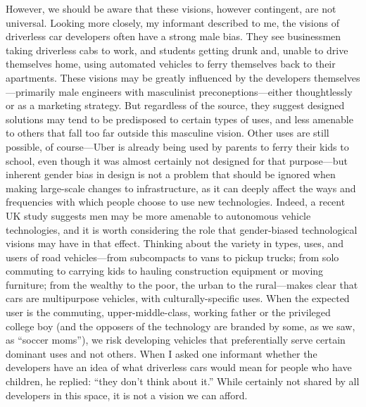 However, we should be aware that these visions, however contingent,
are not universal. Looking more closely, my informant described to me, the visions
of driverless car developers
often have a strong male bias. They see businessmen
taking driverless cabs to work, and students getting drunk and, unable
to drive themselves home, using automated vehicles to ferry themselves
back to their apartments. These visions may be greatly influenced by
the developers themselves---primarily male engineers with masculinist
preconeptions---either thoughtlessly or as a marketing strategy. But
regardless of the source, they suggest designed solutions may tend to
be predisposed to certain types of uses, and less amenable to others
that fall too far outside this masculine vision. Other uses are still
possible, of course---Uber is already being used by parents to ferry
their kids to school, even though it was almost certainly not designed
for that
purpose\cite{???-http://healthland.time.com/2013/11/14/for-more-parents-its-uber-to-the-rescue/--http://www.nytimes.com/2013/09/26/fashion/moms-van-is-called-uber.html?_r=0}---but
inherent gender bias in design is not a problem that should be ignored
when making large-scale changes to infrastructure, as it can deeply
affect the ways and frequencies with which people choose to use new
technologies. Indeed, a recent UK study suggests men may be more
amenable to autonomous vehicle technologies, and it is worth
considering the role that gender-biased technological visions may have
in that
effect\cite{???-http://www.nytimes.com/2013/09/26/fashion/moms-van-is-called-uber.html?_r=0}.
Thinking about the variety in types, uses, and users of road vehicles---from
subcompacts to vans to pickup trucks; from solo commuting to carrying kids to
hauling construction equipment or moving furniture; from the wealthy
to the poor, the urban to the rural---makes clear that cars are
multipurpose vehicles, with culturally-specific uses. When the
expected user is the commuting, upper-middle-class, working father or
the privileged college boy (and the opposers of the technology are
branded by some, as we saw, as ``soccer moms''), we risk developing
vehicles that preferentially serve certain dominant uses and not
others. When I asked one informant whether the developers have an idea
of what driverless cars would mean for people who have children, he
replied:  ``they don't think about it.'' While certainly not shared by
all developers in this space, it is not a vision we can afford.

